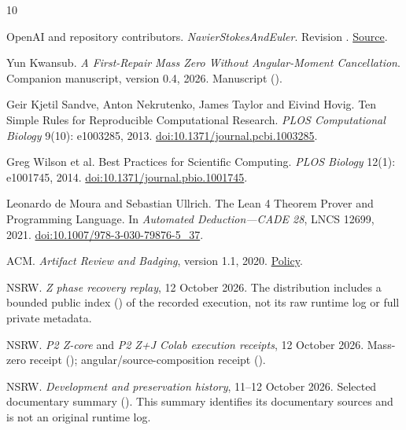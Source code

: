 \documentclass[11pt,a4paper]{article}
\begin{document}
\begin{thebibliography}{10}

OpenAI and repository contributors. \emph{NavierStokesAndEuler}. Revision . \href{https://github.com/openai/NavierStokesAndEuler/tree/8937a8f4cbc7abaab5e9e97d1cc7f5d2319d9538}{Source}.

Yun Kwansub. \emph{A First-Repair Mass Zero Without Angular-Moment Cancellation}. Companion manuscript, version 0.4, 2026. Manuscript ().

Geir Kjetil Sandve, Anton Nekrutenko, James Taylor and Eivind Hovig. Ten Simple Rules for Reproducible Computational Research. \emph{PLOS Computational Biology} 9(10): e1003285, 2013. \href{https://doi.org/10.1371/journal.pcbi.1003285}{doi:10.1371/journal.pcbi.1003285}.

Greg Wilson et al. Best Practices for Scientific Computing. \emph{PLOS Biology} 12(1): e1001745, 2014. \href{https://doi.org/10.1371/journal.pbio.1001745}{doi:10.1371/journal.pbio.1001745}.

Leonardo de Moura and Sebastian Ullrich. The Lean 4 Theorem Prover and Programming Language. In \emph{Automated Deduction---CADE 28}, LNCS 12699, 2021. \href{https://doi.org/10.1007/978-3-030-79876-5_37}{doi:10.1007/978-3-030-79876-5\_37}.

ACM. \emph{Artifact Review and Badging}, version 1.1, 2020. \href{https://www.acm.org/publications/policies/artifact-review-and-badging-current}{Policy}.

NSRW. \emph{Z phase recovery replay}, 12 October 2026. The distribution includes a bounded public index () of the recorded execution, not its raw runtime log or full private metadata.

NSRW. \emph{P2 Z-core} and \emph{P2 Z+J Colab execution receipts}, 12 October 2026. Mass-zero receipt (); angular/source-composition receipt ().

NSRW. \emph{Development and preservation history}, 11--12 October 2026. Selected documentary summary (). This summary identifies its documentary sources and is not an original runtime log.


\end{thebibliography}
\end{document}
